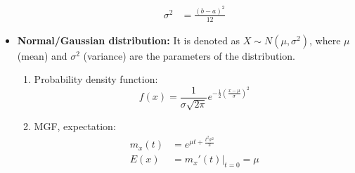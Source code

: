\documentclass[a4paper]{article}
\begin{document}
\begin{itemize}
\begin{enumerate}
\begin{align*}
        \sigma^2 &= \frac{(b-a)^2}{12}
    \end{align*}
    \end{enumerate}
     \item \textbf{Normal/Gaussian distribution:} It is denoted as $X\sim N(\mu,\sigma^2)$, where $\mu$(mean) and $\sigma^2$ (variance) are the parameters of the distribution.
     \begin{enumerate}
         \item Probability density function:
         \begin{equation*}
             f(x) = \frac{1}{\sigma\sqrt{2\pi}}e^{-\frac{1}{2}\left(\frac{x-\mu}{\sigma}\right)^2}
         \end{equation*}
         \item MGF, expectation:
         \begin{align*}
             m_x(t) &= e^{\mu t+\frac{t^2\sigma^2}{2}}\\
             E(x) &= m_x'(t)\Bigr\rvert_{t=0} = \mu
         \end{align*}
     \end{enumerate}
    

\end{itemize}
\end{document}
